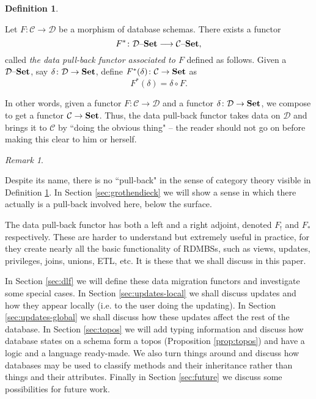 \documentclass{amsart}
\def\mc{\mathcal}
\def\to{\rightarrow}
\def\taking{\colon}
\def\too{\longrightarrow}
\def\Set{{\bf Set}}
\def\set{{\text \textendash}{\bf Set}}
\def\mcC{\mc{C}}
\def\mcD{\mc{D}}
\theoremstyle{remark}
\newtheorem{remark}[theorem]{Remark}
\theoremstyle{definition}
\newtheorem{definition}[theorem]{Definition}
\begin{document}
\begin{definition}\label{def:data pull-back}

Let $F\taking\mcC\to\mcD$ be a morphism of database schemas.  There exists a functor $$F^*\taking\mcD\set\too\mcC\set,$$ called {\em the data pull-back functor associated to $F$} defined as follows.  Given a $\mcD\set$, say $\delta\taking\mcD\to\Set$, define $F^*(\delta)\taking\mcC\to\Set$ as $$F^*(\delta)=\delta\circ F.$$  

\end{definition}

In other words, given a functor $F\taking\mcC\to\mcD$ and a functor $\delta\taking\mcD\to\Set$, we compose to get a functor $\mcC\to\Set$.  Thus,  the data pull-back functor takes data on $\mcD$ and brings it to $\mcC$ by ``doing the obvious thing" -- the reader should not go on before making this clear to him or herself.

\begin{remark}\label{rem:pull-back}

Despite its name, there is no ``pull-back" in the sense of category theory visible in Definition \ref{def:data pull-back}.  In Section \ref{sec:grothendieck} we will show a sense in which there actually is a pull-back involved here, below the surface.

\end{remark}

The data pull-back functor has both a left and a right adjoint, denoted $F_!$ and $F_*$ respectively.  These are harder to understand but extremely useful in practice, for they create nearly all the basic functionality of RDMBSs, such as views, updates, privileges, joins, unions, ETL, etc.  It is these that we shall discuss in this paper.

In Section \ref{sec:dlf} we will define these data migration functors and investigate some special cases.  In Section \ref{sec:updates-local} we shall discuss updates and how they appear locally (i.e. to the user doing the updating).  In Section \ref{sec:updates-global} we shall discuss how these updates affect the rest of the database.  In Section \ref{sec:topos} we will add typing information and discuss how database states on a schema form a topos (Proposition \ref{prop:topos}) and have a logic and a language ready-made.  We also turn things around and discuss how databases may be used to classify methods and their inheritance rather than things and their attributes.  Finally in Section \ref{sec:future} we discuss some possibilities for future work.
\end{document}
